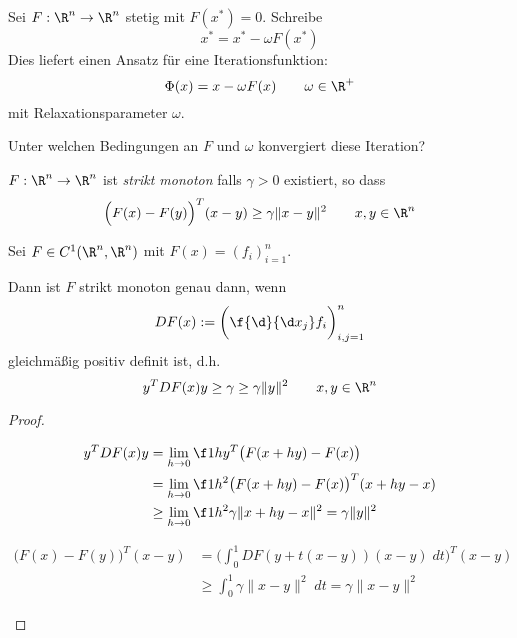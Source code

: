 \documentclass[11pt]{scrbook}
\begin{document}
\begin{seg}
	Sei $F: \R^n \to \R^n$ stetig mit $F(x^*) = 0$.
	Schreibe
	\[
		x^* = x^* - \omega F(x^*)
	\]
	Dies liefert einen Ansatz für eine Iterationsfunktion:
	\[
		\Phi(x) = x - \omega F(x)
		\qquad \omega \in \R^+
	\]
	mit Relaxationsparameter $\omega$.

	Unter welchen Bedingungen an $F$ und $\omega$ konvergiert diese Iteration?
\end{seg}

\begin{df} \label{3.18}
	$F: \R^n \to \R^n$ ist \emph{strikt monoton} falls $\gamma > 0$ existiert, so dass
	\[
		\Big( F(x) - F(y) \Big)^T (x-y) \ge \gamma \|x-y\|^2
		\qquad x,y \in \R^n
	\]
\end{df}

\begin{lem} \label{3.19}
	Sei $F \in C^1(\R^n, \R^n)$ mit $F(x) = (f_i)_{i=1}^n$.

	Dann ist $F$ strikt monoton genau dann, wenn
	\[
		DF(x) := \bigg( \f{\d}{\d x_j}f_i\bigg)_{i,j=1}^n
	\]
	gleichmäßig positiv definit ist, d.h.
	\[
		y^T DF(x) y \ge \gamma \ge \gamma \|y\|^2 \qquad x,y \in \R^n
	\]
	\begin{proof}
		\begin{seg}[„$\implies$“]
			\begin{align*}
				y^T DF(x) y &= \lim_{h \to 0} \f 1h y^T\big(F(x+hy) - F(x)\big) \\
				&= \lim_{h\to 0} \f 1{h^2} \big( F(x+hy) - F(x)\big)^T(x+hy-x) \\
				&\ge \lim_{h\to 0} \f 1{h^2} \gamma\|x+hy-x\|^2 
				= \gamma\|y\|^2
			\end{align*}
		\end{seg}
		\begin{seg}[„$\Longleftarrow$“]
			\begin{align*}
				\big(F(x) - F(y)\big)^T (x-y) 
				&= \bigg( \int_0^1 DF(y+t(x-y))(x-y) \;dt \bigg)^T(x-y) \\
				&\ge \int_0^1 \gamma \|x-y\|^2 \;dt 
				= \gamma \|x-y\|^2
			\end{align*}
		\end{seg}
	\end{proof}
\end{lem}
\end{document}
